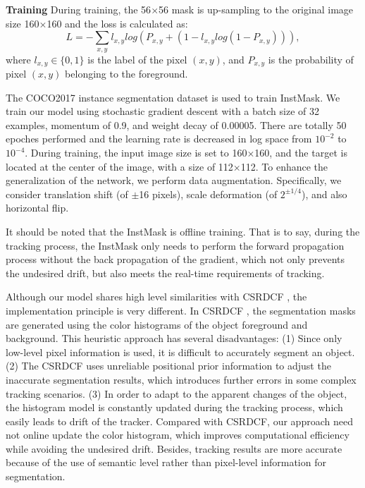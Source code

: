 \documentclass[review]{elsarticle}
\begin{document}
\begin{CJK*}{UTF8}{gbsn}
\textbf{Training} During training, the 56$\times$56 mask is up-sampling to the original image size 160$\times$160 and the loss is calculated as:
\begin{equation}
L = -\sum_{x,y}l_{x,y}log(P_{x,y}+(1-l_{x,y}log(1-P_{x,y}))),
\end{equation}
where $l_{x,y} \in \{0,1\}$ is the label of the pixel $(x,y)$, and $P_{x,y}$ is the probability of pixel $(x,y)$ belonging to the foreground.

The COCO2017 \cite{Lin2014MicrosoftCC} instance segmentation dataset is used to train InstMask. We train our model using stochastic gradient descent with a batch size of 32 examples, momentum of 0.9, and weight decay of 0.00005. There are totally 50 epoches performed and the learning rate is decreased in log space from $10^{-2}$ to $10^{-4}$. During training, the input image size is set to 160$\times$160, and the target is located at the center of the image, with a size of 112$\times$112. To enhance the generalization of the network, we perform data augmentation. Specifically, we consider translation shift (of $\pm$16 pixels), scale deformation (of $2^{\pm 1/4}$), and also horizontal flip.

It should be noted that the InstMask is offline training. That is to say, during the tracking process, the InstMask only needs to perform the forward propagation process without the back propagation of the gradient, which not only prevents the undesired drift, but also meets the real-time requirements of tracking.

Although our model shares high level similarities with CSRDCF \cite{Lukezic2017DiscriminativeCF}, the implementation principle is very different.
In CSRDCF \cite{Lukezic2017DiscriminativeCF}, the segmentation masks are generated using the color histograms of the object foreground and background. This heuristic approach has several disadvantages: (1) Since only low-level pixel information is used, it is difficult to accurately segment an object. (2) The CSRDCF uses unreliable positional prior information to adjust the inaccurate segmentation results, which introduces further errors in some complex tracking scenarios. (3) In order to adapt to the apparent changes of the object, the histogram model is constantly updated during the tracking process, which easily leads to drift of the tracker. 
Compared with CSRDCF, our approach need not online update the color histogram, which improves computational efficiency while avoiding the undesired drift. Besides, tracking results are more accurate because of the use of semantic level rather than pixel-level information for segmentation.


\end{CJK*}
\end{document}
